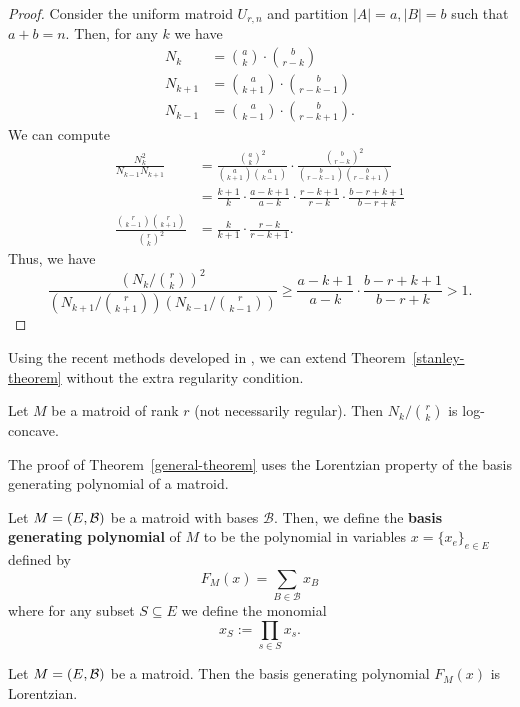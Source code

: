 \documentclass[12pt]{article}
\begin{document}
\begin{proof}
	Consider the uniform matroid $U_{r, n}$ and partition $|A| = a, |B| = b$ such that $a + b = n$. Then, for any $k$ we have
	\begin{align*}
		N_k & = \binom{a}{k} \cdot \binom{b}{r-k} \\
		N_{k+1} & = \binom{a}{k+1} \cdot \binom{b}{r-k-1} \\
		N_{k-1} & = \binom{a}{k-1} \cdot \binom{b}{r-k+1}.
	\end{align*}
	We can compute
	\begin{align*}
		\frac{N_k^2}{N_{k-1} N_{k+1}} & = \frac{\binom{a}{k}^2}{\binom{a}{k+1} \binom{a}{k-1}} \cdot \frac{\binom{b}{r-k}^2}{\binom{b}{r-k-1} \binom{b}{r-k+1}} \\
		& = \frac{k+1}{k} \cdot \frac{a-k+1}{a-k} \cdot \frac{r-k+1}{r-k} \cdot \frac{b-r+k+1}{b-r+k} \\
		\frac{\binom{r}{k-1} \binom{r}{k+1}}{\binom{r}{k}^2} & = \frac{k}{k+1} \cdot \frac{r-k}{r-k+1}.
	\end{align*}
	Thus, we have
	\[
		\frac{(N_k / \binom{r}{k})^2}{(N_{k+1} / \binom{r}{k+1}) (N_{k-1} / \binom{r}{k-1})} \geq \frac{a-k+1}{a-k} \cdot \frac{b-r+k+1}{b-r+k} > 1. 
	\]
\end{proof}

Using the recent methods developed in \cite{lorentzian-polynomials}, we can extend Theorem~\ref{stanley-theorem} without the extra regularity condition. 

\begin{thm} \label{general-theorem}
	Let $M$ be a matroid of rank $r$ (not necessarily regular). Then $N_k / \binom{r}{k}$ is log-concave. 
\end{thm}

The proof of Theorem~\ref{general-theorem} uses the Lorentzian property of the basis generating polynomial of a matroid. 

\begin{defn}
	Let $M = (E, \mathcal{B})$ be a matroid with bases $\mathcal{B}$. Then, we define the \textbf{basis generating polynomial} of $M$ to be the polynomial in variables $x = \{x_e\}_{e \in E}$ defined by 
	\[
		F_M(x) = \sum_{B \in \mathcal{B}} x_B
	\]
	where for any subset $S \subseteq E$ we define the monomial
	\[
		x_S := \prod_{s \in S} x_s. 
	\]
\end{defn}

\begin{prop}
	Let $M = (E, \mathcal{B})$ be a matroid. Then the basis generating polynomial $F_M(x)$ is Lorentzian. 
\end{prop}
\end{document}
